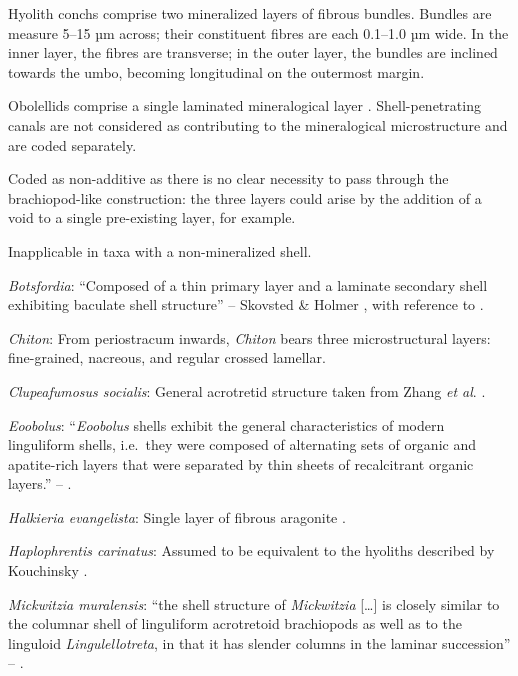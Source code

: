 \documentclass[openany]{book}
\theoremstyle{definition}
\theoremstyle{definition}
\theoremstyle{definition}
\theoremstyle{remark}
\begin{document}
Hyolith conchs comprise two mineralized layers of fibrous bundles.
Bundles are measure 5--15 µm across; their constituent fibres are each
0.1--1.0 µm wide. In the inner layer, the fibres are transverse; in the
outer layer, the bundles are inclined towards the umbo, becoming
longitudinal on the outermost margin.

Obolellids comprise a single laminated mineralogical layer
\citep{Balthasar2008iMummpikia}. Shell-penetrating canals are not
considered as contributing to the mineralogical microstructure and are
coded separately.

Coded as non-additive as there is no clear necessity to pass through the
brachiopod-like construction: the three layers could arise by the
addition of a void to a single pre-existing layer, for example.

Inapplicable in taxa with a non-mineralized shell.

\hypertarget{Botsfordia-coding-61}{}
\emph{Botsfordia}: ``Composed of a thin primary layer and a laminate
secondary shell exhibiting baculate shell structure'' -- Skovsted \&
Holmer \citeyearpar{Skovsted2005EarlyCambrian}, with reference to
\citet{Skovsted2003EarlyCambrian}.

\hypertarget{Chiton-coding-61}{}
\emph{Chiton}: From periostracum inwards, \emph{Chiton} bears three
microstructural layers: fine-grained, nacreous, and regular crossed
lamellar.

\hypertarget{Clupeafumosus_socialis-coding-61}{}
\emph{Clupeafumosus socialis}: General acrotretid structure taken from
Zhang \emph{et al}. \citeyearpar{Zhang2016Epithelialcell}.

\hypertarget{Eoobolus-coding-61}{}
\emph{Eoobolus}: ``\emph{Eoobolus} shells exhibit the general
characteristics of modern linguliform shells, i.e.~they were composed of
alternating sets of organic and apatite-rich layers that were separated
by thin sheets of recalcitrant organic layers.'' --
\citet{Balthasar2007Anearly}.

\hypertarget{Halkieria_evangelista-coding-61}{}
\emph{Halkieria evangelista}: Single layer of fibrous aragonite
\citep{Porter2008}.

\hypertarget{Haplophrentis_carinatus-coding-61}{}
\emph{Haplophrentis carinatus}: Assumed to be equivalent to the hyoliths
described by Kouchinsky
\citeyearpar{Kouchinsky2000Skeletalmicrostructures}.

\hypertarget{Mickwitzia_muralensis-coding-61}{}
\emph{Mickwitzia muralensis}: ``the shell structure of \emph{Mickwitzia}
{[}\ldots{}{]} is closely similar to the columnar shell of linguliform
acrotretoid brachiopods as well as to the linguloid
\emph{Lingulellotreta}, in that it has slender columns in the laminar
succession'' -- \citet{Williams2007Supplement}.
\end{document}
